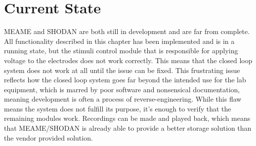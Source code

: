 \section{Current State}
MEAME and SHODAN are both still in development and are far from complete.
All functionality described in this chapter has been implemented and is in a
running state, but the stimuli control module that is responsible for applying
voltage to the electrodes does not work correctly.
This means that the closed loop system does not work at all until the issue can
be fixed.
This frustrating issue reflects how the closed loop system goes far beyond the
intended use for the lab equipment, which is marred by poor software and
nonsensical documentation, meaning development is often a process of
reverse-engineering.
While this flaw means the system does not fulfill its purpose, it's enough to
verify that the remaining modules work.
Recordings can be made and played back, which means that MEAME/SHODAN is already
able to provide a better storage solution than the vendor provided solution.
